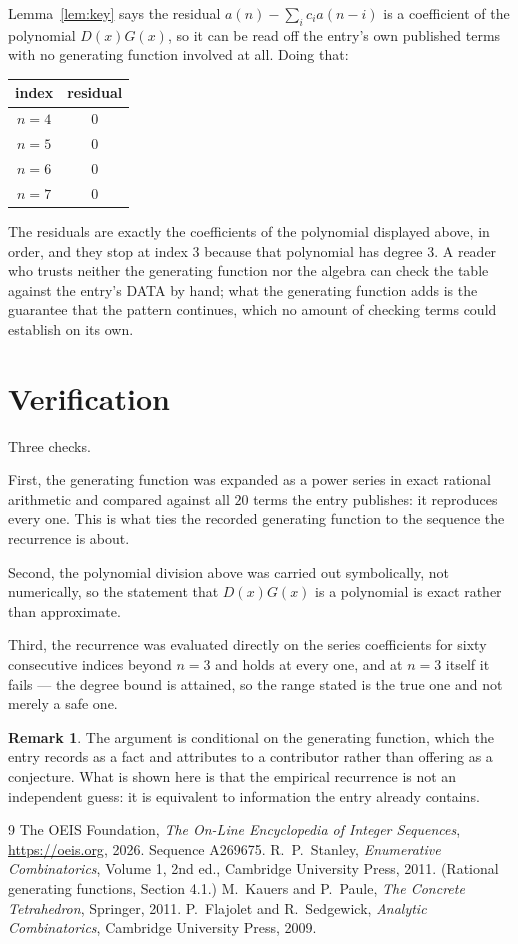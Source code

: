 \documentclass[11pt,a4paper]{article}
\theoremstyle{plain}
\theoremstyle{definition}
\newtheorem{remark}[theorem]{Remark}
\begin{document}
Lemma~\ref{lem:key} says the residual $a(n)-\sum_ic_ia(n-i)$ is a coefficient of the
polynomial $D(x)G(x)$, so it can be read off the entry's own published terms with no
generating function involved at all. Doing that:
\begin{center}
\begin{tabular}{cc}
index & residual \\ \hline
$n=4$ & $0$ \\
$n=5$ & $0$ \\
$n=6$ & $0$ \\
$n=7$ & $0$
\end{tabular}
\end{center}
The residuals are exactly the coefficients of the polynomial displayed above, in order, and
they stop at index $3$ because that polynomial has degree $3$. A reader who trusts
neither the generating function nor the algebra can check the table against the entry's DATA
by hand; what the generating function adds is the guarantee that the pattern continues, which
no amount of checking terms could establish on its own.

\section{Verification}

Three checks.

First, the generating function was expanded as a power series in exact rational arithmetic and
compared against all $20$ terms the entry publishes: it reproduces every one. This is
what ties the recorded generating function to the sequence the recurrence is about.

Second, the polynomial division above was carried out symbolically, not numerically, so the
statement that $D(x)G(x)$ is a polynomial is exact rather than approximate.

Third, the recurrence was evaluated directly on the series coefficients for sixty consecutive
indices beyond $n=3$ and holds at every one, and at $n=3$ itself it fails --- the
degree bound is attained, so the range stated is the true one and not merely a safe one.

\begin{remark}
The argument is conditional on the generating function, which the entry records as a fact and
attributes to a contributor rather than offering as a conjecture. What is shown here is that
the empirical recurrence is not an independent guess: it is equivalent to information the
entry already contains.
\end{remark}

\begin{thebibliography}{9}
 The OEIS Foundation, \emph{The On-Line Encyclopedia of Integer
Sequences}, \url{https://oeis.org}, 2026. Sequence A269675.
 R.~P.~Stanley, \emph{Enumerative Combinatorics}, Volume 1, 2nd ed.,
Cambridge University Press, 2011. (Rational generating functions, Section 4.1.)
 M.~Kauers and P.~Paule, \emph{The Concrete Tetrahedron}, Springer, 2011.
 P.~Flajolet and R.~Sedgewick, \emph{Analytic Combinatorics}, Cambridge
University Press, 2009.
\end{thebibliography}
\end{document}
